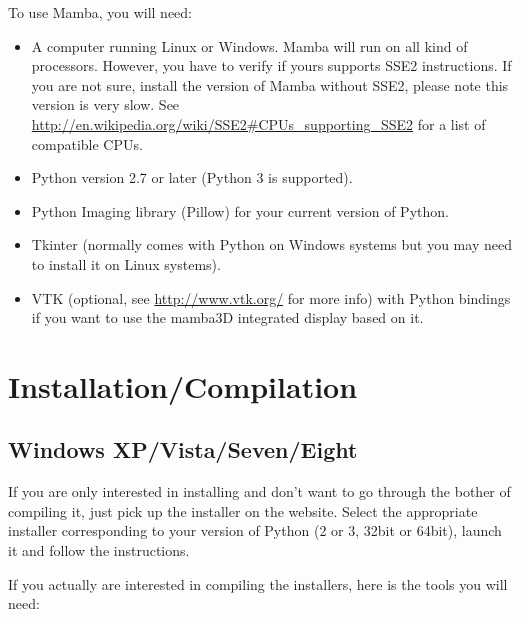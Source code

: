 \documentclass[a4paper,10pt,oneside]{article}
\begin{document}
To use Mamba, you will need:
\begin{itemize}
\item A computer running Linux or Windows. Mamba will run on all kind of 
processors. However, you have to verify if yours supports SSE2 instructions. If you
are not sure, install the version of Mamba without SSE2, please note this version
is very slow. See \url{http://en.wikipedia.org/wiki/SSE2#CPUs_supporting_SSE2}
for a list of compatible CPUs.
\item Python version 2.7 or later (Python 3 is supported).
\item Python Imaging library (Pillow) for your current version of Python.
\item Tkinter (normally comes with Python on Windows systems but you may need to
install it on Linux systems).
\item VTK (optional, see \url{http://www.vtk.org/} for more info) with Python
bindings if you want to use the mamba3D integrated display based on it.
\end{itemize}



\pagebreak

\section{Installation/Compilation}
\label{cha:inst_comp}

\subsection{Windows XP/Vista/Seven/Eight}

If you are only interested in installing and don't want to go through the bother
of compiling it, just pick up the installer on the website. Select the appropriate
installer corresponding to your version of Python (2 or 3, 32bit or 64bit), 
launch it and follow the instructions.

If you actually are interested in compiling the installers, here is the tools
you will need:
\end{document}
